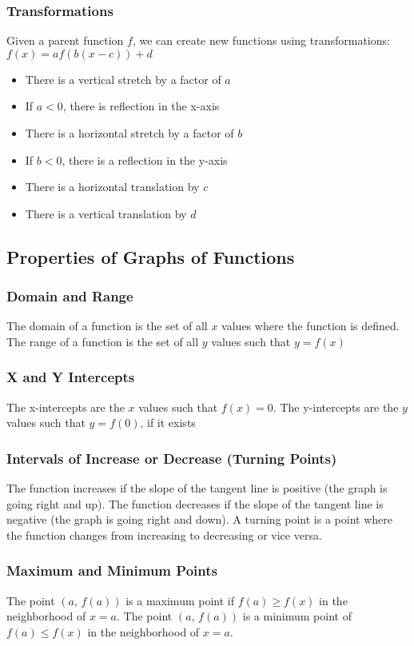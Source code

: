 \documentclass{article}
\begin{document}
	\subsubsection{Transformations}
	Given a parent function $f$, we can create new functions using transformations: $f(x)=af(b(x-c))+d$
	\begin{itemize}
		\item There is a vertical stretch by a factor of $a$
		\item If $a<0$, there is reflection in the x-axis
		\item There is a horizontal stretch by a factor of $b$
		\item If $b<0$, there is a reflection in the y-axis
		\item There is a horizontal translation by $c$
		\item There is a vertical translation by $d$
	\end{itemize}
	\subsection{Properties of Graphs of Functions}
	\subsubsection{Domain and Range}
	The domain of a function is the set of all $x$ values where the function is defined. The range of a function is the set of all $y$ values such that $y=f(x)$
	\subsubsection{X and Y Intercepts}
	The x-intercepts are the $x$ values such that $f(x)=0$. The y-intercepts are the $y$ values such that $y=f(0)$, if it exists
	\subsubsection{Intervals of Increase or Decrease (Turning Points)}
	The function increases if the slope of the tangent line is positive (the graph is going right and up). The function decreases if the slope of the tangent line is negative (the graph is going right and down). A turning point is a point where the function changes from increasing to decreasing or vice versa.
	\subsubsection{Maximum and Minimum Points}
	The point $(a,\,f(a))$ is a maximum point if $f(a)\geqslant f(x)$ in the neighborhood of $x=a$. The point $(a,\,f(a))$ is a minimum point of $f(a)\leqslant f(x)$ in the neighborhood of $x=a$.
\end{document}
